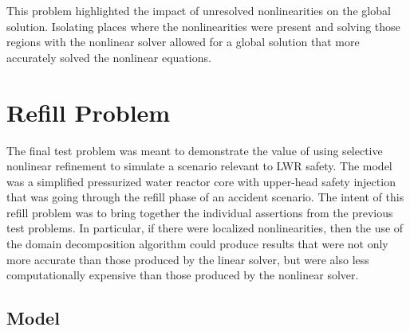This problem highlighted the impact of unresolved nonlinearities on the global solution.
Isolating places where the nonlinearities were present and solving those regions with the nonlinear solver allowed for a global solution that more accurately solved the nonlinear equations.

\section{Refill Problem}
\label{sect:refillProblem}

The final test problem was meant to demonstrate the value of using selective nonlinear refinement to simulate a scenario relevant to LWR safety.
The model was a simplified pressurized water reactor core with upper-head safety injection that was going through the refill phase of an accident scenario.
The intent of this refill problem was to bring together the individual assertions from the previous test problems.
In particular, if there were localized nonlinearities, then the use of the domain decomposition algorithm could produce results that were not only more accurate than those produced by the linear solver, but were also less computationally expensive than those produced by the nonlinear solver.

\subsection{Model}
\label{sect:refillModel}

